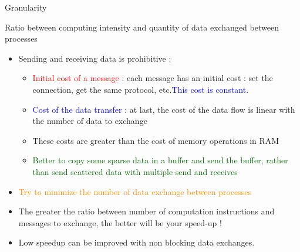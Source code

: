 \documentclass[compress,10pt,aspectratio=169]{beamer}
\begin{document}
\begin{frame}[fragile]{Granularity}
    \scriptsize
    \begin{center}\small Ratio between computing intensity and quantity of data exchanged between processes\end{center}

    \begin{itemize}
        \item Sending and receiving data is prohibitive :
        \begin{itemize}
            \item {\scriptsize \textcolor{red}{Initial cost of a message} : each message has an initial cost : set the connection, 
                   get the same protocol, etc.\textcolor{blue}{This cost is constant.}} 
            \item {\scriptsize \textcolor{blue}{Cost of the data transfer} : at last, the cost of the data flow is linear with the number
            of data to exchange}
            \item {\scriptsize These costs are greater than the cost of memory operations in RAM}
            \item \textcolor{DarkGreen}{\scriptsize Better to copy some sparse data in a buffer and send the buffer, rather than send scattered data with multiple send and receives}
        \end{itemize}
        \item \textcolor{darkorange}{Try to minimize the number of data exchange between processes}
        \item The greater the ratio between number of computation instructions and messages to exchange, the better will be your speed-up !
        \item \alert{Low speedup can be improved with non blocking data exchanges}.
    \end{itemize}
\end{frame}
\end{document}
